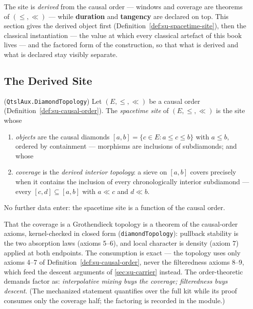 The site is \emph{derived} from the causal order --- windows and coverage are
theorems of $(\le, \ll)$ --- while \textbf{duration} and \textbf{tangency} are
declared on top. This section gives the derived object first
(Definition~\ref{def:su-spacetime-site}), then the classical instantiation --- the
value at which every classical artefact of this book lives --- and the
factored form of the construction, so that what is derived and what is
declared stay visibly separate.

\subsection{The Derived Site}

\begin{definition}\label{def:su-spacetime-site}
(\texttt{QtslAux.DiamondTopology})
Let $(E, \le, \ll)$ be a causal order (Definition~\ref{def:su-causal-order}). The
\emph{spacetime site} of $(E, \le, \ll)$ is the site whose
\begin{enumerate}
\item \emph{objects} are the causal diamonds
  $[a,b] = \{c \in E : a \le c \le b\}$ with $a \le b$, ordered by
  containment --- morphisms are inclusions of subdiamonds; and whose
\item \emph{coverage} is the \emph{derived interior topology}: a sieve on
  $[a,b]$ covers precisely when it contains the inclusion of every
  chronologically interior subdiamond --- every $[c,d] \subseteq [a,b]$ with
  $a \ll c$ and $d \ll b$.
\end{enumerate}
No further data enter: the spacetime site is a function of the causal order.
\end{definition}

That the coverage is a Grothendieck topology is a theorem of the causal-order
axioms, kernel-checked in closed form (\texttt{diamondTopology}): pullback
stability is the two absorption laws (axioms 5--6), and local character is
density (axiom 7) applied at both endpoints. The consumption is exact --- the
topology uses only axioms 4--7 of Definition~\ref{def:su-causal-order}, never the
filteredness axioms 8--9, which feed the descent arguments of
\autoref{sec:su-carrier} instead. The order-theoretic demands factor as:
\emph{interpolative mixing buys the coverage; filteredness buys descent}. (The
mechanized
statement quantifies over the full kit while its proof consumes only the
coverage half; the factoring is recorded in the module.)

